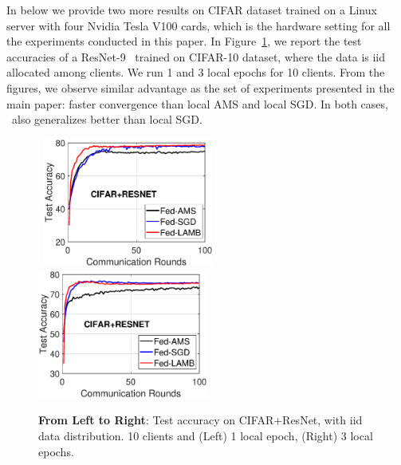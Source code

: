 \documentclass[twoside]{article}
\begin{document}
In below we provide two more results on CIFAR dataset trained on a Linux server with four Nvidia Tesla V100 cards, which is the hardware setting for all the experiments conducted in this paper. In Figure~\ref{fig:cifar-cnn-iid-bis}, we report the test accuracies of a ResNet-9~\cite{Proc:He-resnet16} trained on CIFAR-10 dataset, where the data is iid allocated among clients. 
We run 1 and 3 local epochs for 10 clients. From the figures, we observe similar advantage as the set of experiments presented in the main paper: faster convergence than local AMS and local SGD. In both cases, \algo\ also generalizes better than local SGD.


\begin{figure}[H]
    \begin{center}
        \mbox{
        \includegraphics[width=0.5\textwidth]{figure/cifar_testerror_resnet_ep1_client10_iid1_SGD.eps}
                \includegraphics[width=0.5\textwidth]{figure/cifar_testerror_resnet_ep3_client10_iid1_SGD.eps}
        }
    \end{center}
	\caption{\textbf{From Left to Right}: Test accuracy on CIFAR+ResNet, with iid data distribution. 10 clients and (Left) 1 local epoch, (Right) 3 local epochs.}
	\label{fig:cifar-cnn-iid-bis}
\end{figure}
\end{document}
